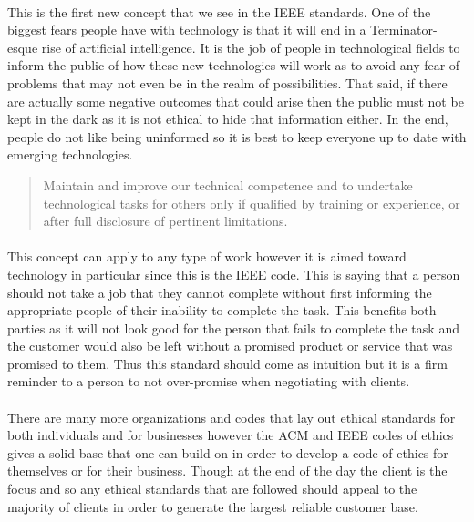 \documentclass[a4paper,12pt]{article}
\begin{document}
\paragraph{}This is the first new concept that we see in the IEEE standards. One of the biggest fears people have with technology is that it will end in a Terminator-esque rise of artificial intelligence. It is the job of people in technological fields to inform the public of how these new technologies will work as to avoid any fear of problems that may not even be in the realm of possibilities. That said, if there are actually some negative outcomes that could arise then the public must not be kept in the dark as it is not ethical to hide that information either. In the end, people do not like being uninformed so it is best to keep everyone up to date with emerging technologies.
	\begin{quote}
	Maintain and improve our technical competence and to undertake technological tasks for others only if qualified by training or experience, or after full disclosure of pertinent limitations.
	\end{quote}
\paragraph{}This concept can apply to any type of work however it is aimed toward technology in particular since this is the IEEE code. This is saying that a person should not take a job that they cannot complete without first informing the appropriate people of their inability to complete the task. This benefits both parties as it will not look good for the person that fails to complete the task and the customer would also be left without a promised product or service that was promised to them. Thus this standard should come as intuition but it is a firm reminder to a person to not over-promise when negotiating with clients.
\paragraph{}There are many more organizations and codes that lay out ethical standards for both individuals and for businesses however the ACM and IEEE codes of ethics gives a solid base that one can build on in order to develop a code of ethics for themselves or for their business. Though at the end of the day the client is the focus and so any ethical standards that are followed should appeal to the majority of clients in order to generate the largest reliable customer base.
\end{document}
